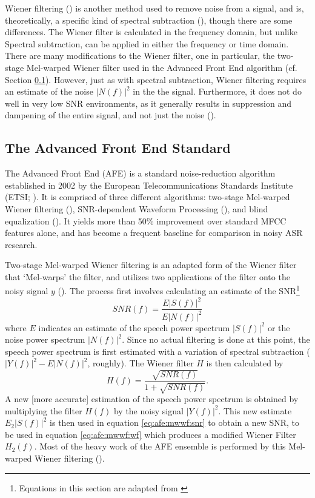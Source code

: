 Wiener filtering (\cite{lim:79}) is another method used to remove noise from a signal, and is, theoretically, a specific kind of spectral subtraction (\cite{agarwal:99}), though there are some differences. The Wiener filter is calculated in the frequency domain, but unlike Spectral subtraction, can be applied in either the frequency or time domain. There are many modifications to the Wiener filter, one in particular, the two-stage Mel-warped Wiener filter used in the Advanced Front End algorithm (cf. Section \ref{sec:background-afe}). %
However, just as with spectral subtraction, Wiener filtering requires an estimate of the noise $|N(f)|^2$ in the the signal.  Furthermore, it does not do well in very low SNR environments, as it generally results in suppression and dampening of the entire signal, and not just the noise (\cite{li:14}).


\subsection{The Advanced Front End Standard}\label{sec:background-afe}

The Advanced Front End (AFE) is a standard noise-reduction algorithm established in 2002 by the European Telecommunications Standards Institute (ETSI; \cite{etsi:02}).  It is comprised of three different algorithms: two-stage Mel-warped Wiener filtering (\cite{agarwal:99}), SNR-dependent Waveform Processing (\cite{macho:01}), and blind equalization (\cite{mauuary:98}).  It yields more than 50\% improvement over standard MFCC features alone, and has become a frequent baseline for comparison in noisy ASR research.

Two-stage Mel-warped Wiener filtering is an adapted form of the Wiener filter that `Mel-warps' the filter, and utilizes two applications of the filter onto the noisy signal $y$ (\cite{etsi:02}).  The process first involves calculating an estimate of the SNR\footnote{Equations in this section are adapted from \cite{etsi:02}} \begin{equation}\label{eq:afe:mwwf:snr} SNR(f) = \dfrac{E|S(f)|^2}{E|N(f)|^2} \end{equation} where $E$ indicates an estimate of the speech power spectrum $|S(f)|^2$ or the noise power spectrum $|N(f)|^2$.  Since no actual filtering is done at this point, the speech power spectrum is first estimated with a variation of spectral subtraction ($|Y(f)|^2 - E|N(f)|^2$, roughly).  The Wiener filter $H$ is then calculated by \begin{equation}\label{eq:afe:mwwf:wf} H(f) = \dfrac{\sqrt{SNR(f)}}{1+\sqrt{SNR(f)}}. \end{equation}  A new [more accurate] estimation of the speech power spectrum is obtained by multiplying the filter $H(f)$ by the noisy signal $|Y(f)|^2$.  This new estimate $E_2|S(f)|^2$ is then used in equation \ref{eq:afe:mwwf:snr} to obtain a new SNR, to be used in equation \ref{eq:afe:mwwf:wf} which produces a modified Wiener Filter $H_2(f)$.  Most of the heavy work of the AFE ensemble is performed by this Mel-warped Wiener filtering (\cite{li:14}).

